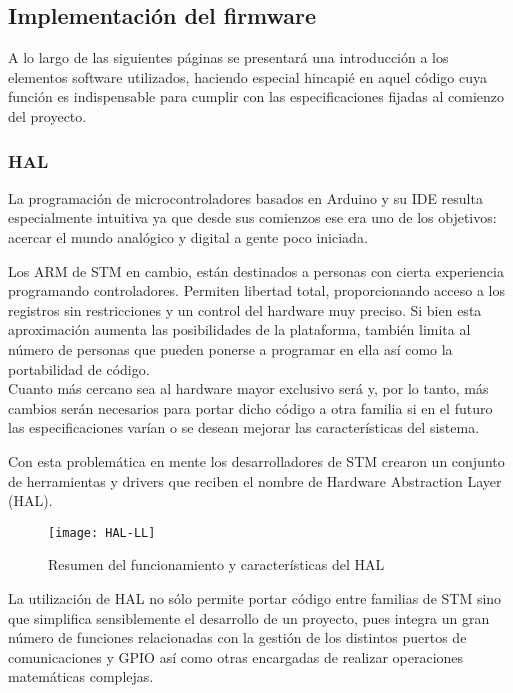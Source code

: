 \clearpage

\subsection{Implementación del firmware \label{sec:Software_micro_HAL}}

A lo largo de las siguientes páginas se presentará una introducción a los elementos software utilizados, haciendo especial hincapié en aquel código cuya función es indispensable para cumplir con las especificaciones fijadas al comienzo del proyecto.

\subsubsection{HAL \label{sec:Software_micro_HAL}}

La programación de microcontroladores basados en Arduino y su \acrshort{IDE} resulta especialmente intuitiva ya que desde sus comienzos ese era uno de los objetivos: acercar el mundo analógico y digital a gente poco iniciada.

Los ARM de STM en cambio, están destinados a personas con cierta experiencia programando controladores. Permiten libertad total, proporcionando acceso a los registros sin restricciones y un control del hardware muy preciso. Si bien esta aproximación aumenta las posibilidades de la plataforma, también limita al número de personas que pueden ponerse a programar en ella así como la portabilidad de código.
\\Cuanto más cercano sea al hardware mayor exclusivo será y, por lo tanto, más cambios serán necesarios para portar dicho código a otra familia si en el futuro las especificaciones varían o se desean mejorar las características del sistema.

Con esta problemática en mente los desarrolladores de STM crearon un conjunto de herramientas y drivers que reciben el nombre de Hardware Abstraction Layer (\acrshort{HAL}).

\begin{figure} [h]
    \centering
    \texttt{[image: HAL-LL]}
    \caption{Resumen del funcionamiento y características del HAL \cite{HAL-LL}}
    \label{fig:HAL-LL}
\end{figure}

La utilización de \acrshort{HAL} no sólo permite portar código entre familias de STM sino que simplifica sensiblemente el desarrollo de un proyecto, pues integra un gran número de funciones relacionadas con la gestión de los distintos puertos de comunicaciones y GPIO así como otras encargadas de realizar operaciones matemáticas complejas.


